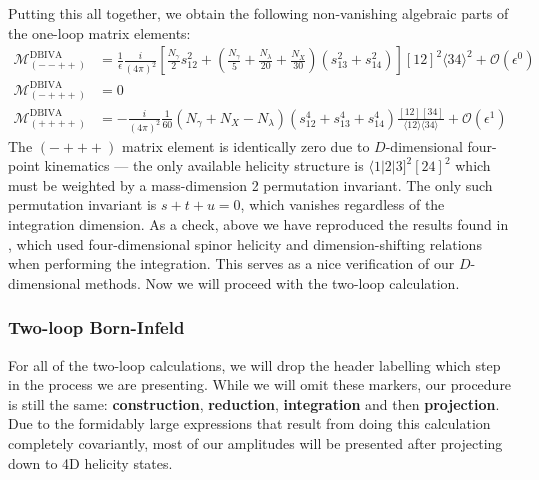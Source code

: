 \documentclass[11pt,letter]{article}
\begin{document}
Putting this all together, we obtain the following non-vanishing algebraic parts of the one-loop matrix elements:
\begin{align}
\mathcal{M}^{\text{DBIVA}} _{(--++)}&= \frac{1}{\epsilon}\frac{i}{(4\pi)^2}\left[\frac{N_\gamma}{2}s_{12}^2+\left(\frac{N_\gamma}{5}+\frac{N_\lambda}{20}+\frac{N_X}{30}\right)(s_{13}^2+s_{14}^2)\right][12]^2\langle34\rangle^2+\mathcal{O}(\epsilon^0)
\\
\mathcal{M}^{\text{DBIVA}}_{(-+++)}&= 0
\\
\mathcal{M}^{\text{DBIVA}}_{(++++)}&= -\frac{i}{(4\pi)^2}\frac{1}{60}\left(N_\gamma+N_X-N_\lambda\right) (s_{12}^4+s_{13}^4+s_{14}^4)\frac{[12][34]}{\langle12\rangle\langle 34\rangle}+\mathcal{O}(\epsilon^1) \label{eq:generalDBI1loop}
\end{align}
The $(-+++)$ matrix element is identically zero due to $D$-dimensional four-point kinematics --- the only available helicity structure is $\langle 1|2|3]^2[24]^2$ which must be weighted by a mass-dimension 2 permutation invariant. The only such permutation invariant is $s+t+u =0$, which vanishes regardless of the integration dimension. As a check, above we have reproduced the results found in \cite{Elvang:2020kuj}, which used four-dimensional spinor helicity and dimension-shifting relations when performing the integration. This serves as a nice verification of our $D$-dimensional methods. Now we will proceed with the two-loop calculation. 
\subsubsection{Two-loop Born-Infeld}\label{sec:2loopBIU}
For all of the two-loop calculations, we will drop the header labelling which step in the process we are presenting. While we will omit these markers, our procedure is still the same: \textbf{construction}, \textbf{reduction}, \textbf{integration} and then \textbf{projection}. Due to the formidably large expressions that result from doing this calculation completely covariantly, most of our amplitudes will be presented {after} projecting down to 4D helicity states. 
\end{document}

